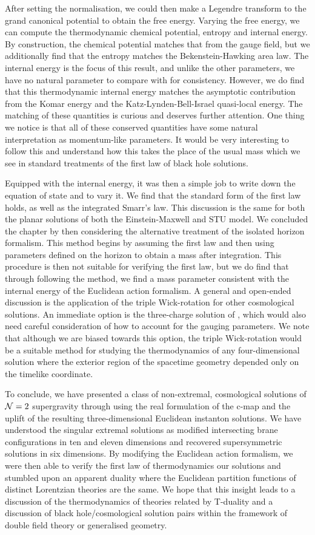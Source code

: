 After setting the normalisation, we could then make a Legendre transform to the grand canonical potential to obtain the free energy. Varying the free energy, we can compute the thermodynamic chemical potential, entropy and internal energy. By construction, the chemical potential matches that from the gauge field, but we additionally find that the entropy matches the Bekenstein-Hawking area law. The internal energy is the focus of this result, and unlike the other parameters, we have no natural parameter to compare with for consistency. However, we do find that this thermodynamic internal energy matches the asymptotic contribution from the Komar energy and the Katz-Lynden-Bell-Israel quasi-local energy. The matching of these quantities is curious and deserves further attention. One thing we notice is that all of these conserved quantities have some natural interpretation as momentum-like parameters. It would be very interesting to follow this and understand how this takes the place of the usual mass which we see in standard treatments of the first law of black hole solutions.

Equipped with the internal energy, it was then a simple job to write down the equation of state and to vary it. We find that the standard form of the first law holds, as well as the integrated Smarr's law. This discussion is the same for both the planar solutions of both the Einstein-Maxwell and STU model. We concluded the chapter by then considering the alternative treatment of the isolated horizon formalism. This method begins by assuming the first law and then using parameters defined on the horizon to obtain a mass after integration. This procedure is then not suitable for verifying the first law, but we do find that through following the method, we find a mass parameter consistent with the internal energy of the Euclidean action formalism. A general and open-ended discussion is the application of the triple Wick-rotation for other cosmological solutions. An immediate option is the three-charge solution of \cite{Gutowski:2019iyo}, which would also need careful consideration of how to account for the gauging parameters. We note that although we are biased towards this option, the triple Wick-rotation would be a suitable method for studying the thermodynamics of any four-dimensional solution where the exterior region of the spacetime geometry depended only on the timelike coordinate.

To conclude, we have presented a class of non-extremal, cosmological solutions of ${\cal N} = 2$ supergravity through using the real formulation of the c-map and the uplift of the resulting three-dimensional Euclidean instanton solutions. We have understood the singular extremal solutions as modified intersecting brane configurations in ten and eleven dimensions and recovered supersymmetric solutions in six dimensions. By modifying the Euclidean action formalism, we were then able to verify the first law of thermodynamics our solutions and stumbled upon an apparent duality where the Euclidean partition functions of distinct Lorentzian theories are the same. We hope that this insight leads to a discussion of the thermodynamics of theories related by T-duality and a discussion of black hole/cosmological solution pairs within the framework of double field theory or generalised geometry.